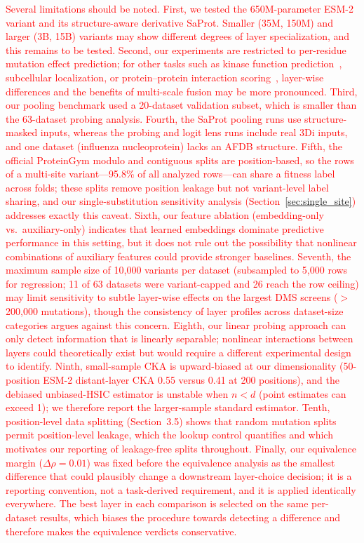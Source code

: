 \documentclass[11pt,a4paper]{article}
\newcommand{\rev}[1]{\textcolor{red}{#1}}
\begin{document}
\textcolor{red}{Several limitations should be noted. First, we tested the 650M-parameter
ESM-2 variant and its structure-aware derivative SaProt. Smaller (35M, 150M)
and larger (3B, 15B) variants may show different degrees of layer specialization,
and this remains to be tested. Second, our
experiments are restricted to per-residue mutation effect prediction; for other
tasks such as kinase function prediction~\cite{kumar2025}, subcellular
localization, or protein--protein interaction scoring~\cite{elshaffei2025},
layer-wise differences and the benefits of multi-scale fusion may be more
pronounced. Third, our pooling benchmark used a 20-dataset validation subset,
which is smaller than the \rev{63}-dataset probing analysis. \rev{Fourth,
the SaProt pooling runs use structure-masked inputs, whereas the probing and logit
lens runs include real 3Di inputs, and one dataset (influenza nucleoprotein) lacks
an AFDB structure. Fifth, the official ProteinGym modulo and contiguous splits
are position-based, so the rows of a multi-site variant---95.8\% of all
analyzed rows---can share a fitness label across folds; these splits remove
position leakage but not variant-level label sharing, and our
single-substitution sensitivity analysis (Section~\ref{sec:single_site})
addresses exactly this caveat. Sixth, our}
feature ablation (embedding-only vs.\ auxiliary-only) indicates that learned embeddings
dominate predictive performance in this setting, but it does
not rule out the possibility that nonlinear combinations of auxiliary features
could provide stronger baselines.
\rev{Seventh,} the
maximum sample size of 10,000 \rev{variants} per dataset (subsampled to 5,000
\rev{rows} for regression\rev{; 11 of 63 datasets were variant-capped and 26
reach the row ceiling}) may limit sensitivity to
subtle layer-wise effects on the largest DMS screens ($>$200,000 mutations),
though the consistency of \rev{layer profiles} across dataset-size categories argues
against this concern. \rev{Eighth,} our linear probing approach can only detect
information that is linearly separable; nonlinear interactions between layers
could theoretically exist but would require a different experimental design to
identify. \rev{Ninth, small-sample CKA is upward-biased at our dimensionality
(50-position ESM-2 distant-layer CKA 0.55 versus 0.41 at 200 positions), and
the debiased unbiased-HSIC estimator is unstable when $n < d$ (point estimates
can exceed 1); we therefore report the larger-sample standard estimator.
Tenth,} position-level data splitting (Section~3.5) shows that
random mutation splits permit position-level leakage, \rev{which the lookup
control quantifies and which motivates our reporting of leakage-free splits
throughout. Finally, our equivalence margin}
($\Delta\rho = 0.01$) \rev{was fixed before the equivalence analysis as the
smallest difference that could plausibly change a downstream layer-choice
decision; it is a reporting convention, not a task-derived requirement, and it
is applied identically everywhere.} \rev{The best layer in each comparison is
selected on the same per-dataset results, which biases the procedure towards
detecting a difference and therefore makes the equivalence verdicts
conservative.}}
\end{document}
